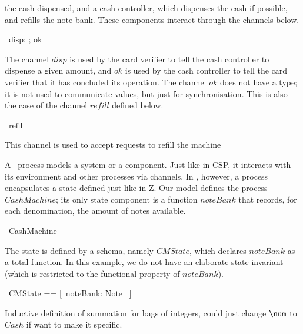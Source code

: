 \documentclass{article}
\begin{document}
the cash dispensed, and a cash controller, which dispenses the cash
if possible, and refills the note bank. These components interact
through the channels below.
\begin{circus}
  \circchannel\ disp: \nat; ok
\end{circus}
The channel $disp$ is used by the card verifier to tell the cash
controller to dispense a given amount, and $ok$ is used by the cash
controller to tell the card verifier that it has concluded its
operation. The channel $ok$ does not have a type; it is not used to
communicate values, but just for synchronisation.  This is also the
case of the channel $refill$ defined below.
\begin{circus}
  \circchannel\ refill
\end{circus}
This channel is used to accept requests to refill the machine

A \Circus\ process models a system or a component.  Just like in CSP,
it interacts with its environment and other processes via channels.
In \Circus, however, a process encapsulates a state defined just like
in Z.  Our model defines the process $CashMachine$; its only state
component is a function $noteBank$ that records, for each
denomination, the amount of notes available.
\begin{circus}
  \circprocess\ CashMachine \circdef \circbegin
\end{circus}
The state is defined by a schema, namely $CMState$, which declares
$noteBank$ as a total function.  In this example, we do not have an
elaborate state invariant (which is restricted to the functional
property of $noteBank$).
\begin{circusaction}
  \circstate\ CMState == [~noteBank: Note \fun \nat~]
\end{circusaction}

Inductive definition of summation for bags of integers,
could just change $\num$ to $Cash$ if want to make it specific.
%
\end{document}

